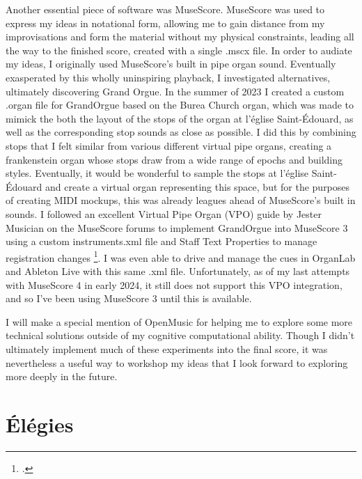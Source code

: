 \documentclass[12pt,twoside,maitrise]{dms_ks}
\theoremstyle{definition}
\begin{document}
Another essential piece of software was MuseScore. 
MuseScore was used to express my ideas in notational form, allowing me to gain distance from my improvisations and form the material without my physical constraints, leading all the way to the finished score, created with a single .mscx file. 
In order to audiate my ideas, I originally used MuseScore's built in pipe organ sound. 
Eventually exasperated by this wholly uninspiring playback, I investigated alternatives, ultimately discovering Grand Orgue. 
In the summer of 2023 I created a custom .organ file for GrandOrgue based on the Burea Church organ, which was made to mimick the both the layout of the stops of the organ at l'église Saint-Édouard, as well as the corresponding stop sounds as close as possible. 
I did this by combining stops that I felt similar from various different virtual pipe organs, creating a frankenstein organ whose stops draw from a wide range of epochs and building styles. 
Eventually, it would be wonderful to sample the stops at l'église Saint-Édouard and create a virtual organ representing this space, but for the purposes of creating MIDI mockups, this was already leagues ahead of MuseScore's built in sounds. 
I followed an excellent Virtual Pipe Organ (VPO) guide by Jester Musician on the MuseScore forums to implement GrandOrgue into MuseScore 3 using a custom instruments.xml file and Staff Text Properties to manage registration changes \footcite{musician_jester_how_2018}. 
I was even able to drive and manage the cues in OrganLab and Ableton Live with this same .xml file. 
Unfortunately, as of my last attempts with MuseScore 4 in early 2024, it still does not support this VPO integration, and so I've been using MuseScore 3 until this is available.


I will make a special mention of OpenMusic for helping me to explore some more technical solutions outside of my cognitive computational ability. 
Though I didn't ultimately implement much of these experiments into the final score, it was nevertheless a useful way to workshop my ideas that I look forward to exploring more deeply in the future.

\chapter{Élégies}
\end{document}
